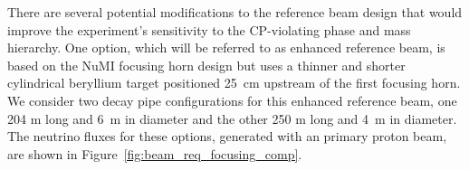 There are several potential modifications to the reference beam design
that would improve the experiment's sensitivity to the CP-violating
phase and mass hierarchy.  One option, which will be referred to as enhanced
reference beam, 
is based on the NuMI focusing horn design but uses a
thinner and shorter cylindrical beryllium target positioned 25~cm
upstream of the first focusing horn. We consider two decay pipe
configurations for this enhanced reference beam, one 204 m long and 6~m 
in diameter and the other 250 m long and 4~m in diameter.  The
neutrino fluxes for these options, generated with an  %
primary proton beam, are shown in Figure~\ref{fig:beam_req_focusing_comp}.
  
